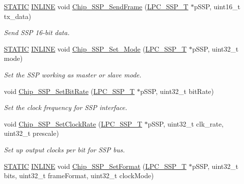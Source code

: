 \begin{DoxyCompactItemize}
\hyperlink{group__LPC__Types__Public__Macros_ga10b2d890d871e1489bb02b7e70d9bdfb}{S\+T\+A\+T\+IC} \hyperlink{group__LPC__Types__Public__Types_ga2eb6f9e0395b47b8d5e3eeae4fe0c116}{I\+N\+L\+I\+NE} void \hyperlink{group__SSP__17XX__40XX_gab01849b80cad7f46924a04346560006c}{Chip\+\_\+\+S\+S\+P\+\_\+\+Send\+Frame} (\hyperlink{structLPC__SSP__T}{L\+P\+C\+\_\+\+S\+S\+P\+\_\+T} $\ast$p\+S\+SP, uint16\+\_\+t tx\+\_\+data)
\begin{DoxyCompactList}\small\item\em Send S\+SP 16-\/bit data. \end{DoxyCompactList}\item 
\hyperlink{group__LPC__Types__Public__Macros_ga10b2d890d871e1489bb02b7e70d9bdfb}{S\+T\+A\+T\+IC} \hyperlink{group__LPC__Types__Public__Types_ga2eb6f9e0395b47b8d5e3eeae4fe0c116}{I\+N\+L\+I\+NE} void \hyperlink{group__SSP__17XX__40XX_ga9b5a23b5030facdb75c3ed06d5e86172}{Chip\+\_\+\+S\+S\+P\+\_\+\+Set\+\_\+\+Mode} (\hyperlink{structLPC__SSP__T}{L\+P\+C\+\_\+\+S\+S\+P\+\_\+T} $\ast$p\+S\+SP, uint32\+\_\+t mode)
\begin{DoxyCompactList}\small\item\em Set the S\+SP working as master or slave mode. \end{DoxyCompactList}\item 
void \hyperlink{group__SSP__17XX__40XX_ga373660d8ad7b28fb71209539b1e72717}{Chip\+\_\+\+S\+S\+P\+\_\+\+Set\+Bit\+Rate} (\hyperlink{structLPC__SSP__T}{L\+P\+C\+\_\+\+S\+S\+P\+\_\+T} $\ast$p\+S\+SP, uint32\+\_\+t bit\+Rate)
\begin{DoxyCompactList}\small\item\em Set the clock frequency for S\+SP interface. \end{DoxyCompactList}\item 
void \hyperlink{group__SSP__17XX__40XX_ga49832a18e0618a82afd66caa6f868445}{Chip\+\_\+\+S\+S\+P\+\_\+\+Set\+Clock\+Rate} (\hyperlink{structLPC__SSP__T}{L\+P\+C\+\_\+\+S\+S\+P\+\_\+T} $\ast$p\+S\+SP, uint32\+\_\+t clk\+\_\+rate, uint32\+\_\+t prescale)
\begin{DoxyCompactList}\small\item\em Set up output clocks per bit for S\+SP bus. \end{DoxyCompactList}\item 
\hyperlink{group__LPC__Types__Public__Macros_ga10b2d890d871e1489bb02b7e70d9bdfb}{S\+T\+A\+T\+IC} \hyperlink{group__LPC__Types__Public__Types_ga2eb6f9e0395b47b8d5e3eeae4fe0c116}{I\+N\+L\+I\+NE} void \hyperlink{group__SSP__17XX__40XX_ga381ba3a6b470b2c84468b88deed8ac18}{Chip\+\_\+\+S\+S\+P\+\_\+\+Set\+Format} (\hyperlink{structLPC__SSP__T}{L\+P\+C\+\_\+\+S\+S\+P\+\_\+T} $\ast$p\+S\+SP, uint32\+\_\+t bits, uint32\+\_\+t frame\+Format, uint32\+\_\+t clock\+Mode)

\end{DoxyCompactItemize}
